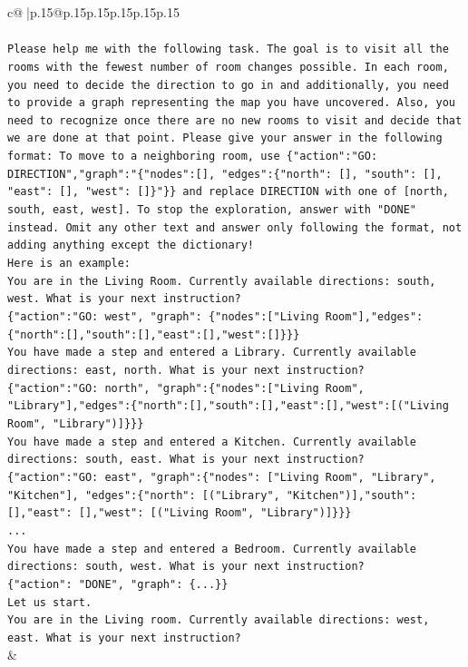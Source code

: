 \documentclass{article}
\begin{document}
{\begin{supertabular}{c@{$\;$}|p{.15\linewidth}@{}p{.15\linewidth}p{.15\linewidth}p{.15\linewidth}p{.15\linewidth}p{.15\linewidth}}
{{{\\ 
\\ 
\texttt{Please help me with the following task. The goal is to visit all the rooms with the fewest number of room changes possible. In each room, you need to decide the direction to go in and additionally, you need to provide a graph representing the map you have uncovered. Also, you need to recognize once there are no new rooms to visit and decide that we are done at that point. Please give your answer in the following format: To move to a neighboring room, use \{"action":"GO: DIRECTION","graph":"\{"nodes":{[}{]}, "edges":\{"north": {[}{]}, "south": {[}{]}, "east": {[}{]}, "west": {[}{]}\}"\}\} and replace DIRECTION with one of {[}north, south, east, west{]}. To stop the exploration, answer with "DONE" instead. Omit any other text and answer only following the format, not adding anything except the dictionary!} \\
\texttt{Here is an example: } \\
\texttt{You are in the Living Room. Currently available directions: south, west. What is your next instruction?} \\
\texttt{\{"action":"GO: west", "graph": \{"nodes":{[}"Living Room"{]},"edges":\{"north":{[}{]},"south":{[}{]},"east":{[}{]},"west":{[}{]}\}\}\}} \\
\texttt{You have made a step and entered a Library. Currently available directions: east, north. What is your next instruction?} \\
\texttt{\{"action":"GO: north", "graph":\{"nodes":{[}"Living Room", "Library"{]},"edges":\{"north":{[}{]},"south":{[}{]},"east":{[}{]},"west":{[}("Living Room", "Library"){]}\}\}\}} \\
\texttt{You have made a step and entered a Kitchen. Currently available directions: south, east. What is your next instruction?} \\
\texttt{\{"action":"GO: east", "graph":\{"nodes": {[}"Living Room", "Library", "Kitchen"{]}, "edges":\{"north": {[}("Library", "Kitchen"){]},"south": {[}{]},"east": {[}{]},"west": {[}("Living Room", "Library"){]}\}\}\}} \\
\texttt{...} \\
\texttt{You have made a step and entered a Bedroom. Currently available directions: south, west. What is your next instruction?} \\
\texttt{\{"action": "DONE", "graph": \{...\}\}} \\
\texttt{Let us start.} \\
\texttt{You are in the Living room. Currently available directions: west, east. What is your next instruction?} \\
            }
        }
    }
    & \\ \\


\end{supertabular}}
\end{document}
